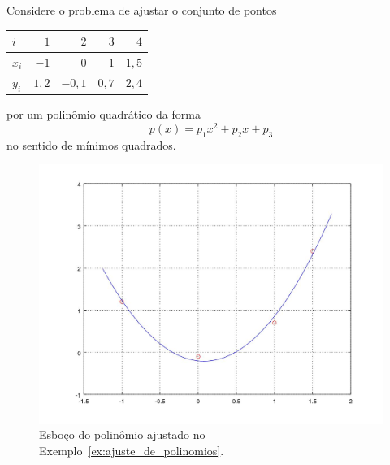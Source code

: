 \begin{ex}\label{ex:ajuste_de_polinomios}
  Considere o problema de ajustar o conjunto de pontos
  \begin{center}
    \begin{tabular}{l|rrrr}
      $i$ & $1$ & $2$ & $3$ & $4$ \\\hline
      $x_i$ & $-1$ & $0$ & $1$ & $1,5$\\
      $y_i$ & $1,2$ & $-0,1$ & $0,7$ & $2,4$\\\hline
    \end{tabular}
  \end{center}
  por um polinômio quadrático da forma
  \begin{equation}
    p(x) = p_1x^2 + p_2x + p_3
  \end{equation}
  no sentido de mínimos quadrados.  

  \begin{figure}[h]
    \centering
    \includegraphics[width=\textwidth]{cap_ajuste/dados/ex_mq_poli/ex_mq_poli}
    \caption{Esboço do polinômio ajustado no Exemplo~\ref{ex:ajuste_de_polinomios}.}
    \label{fig:ex_mq_poli}
  \end{figure}
  

\end{ex}
